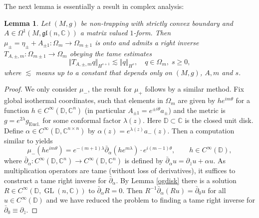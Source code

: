 \documentclass[JEP,XML,SOM,Unicode,published]{cedram}
\DeclareMathOperator{\GL}{GL}
\theoremstyle{plain}
\newtheorem{lemma}[theorem]{Lemma}
\theoremstyle{definition}
\newcommand{\C}{\mathbb{C}}
\newcommand{\DD}{\mathbb{D}}
\newcommand{\gl}{\mathfrak{gl}}
\newcommand{\1}{{\bf 1}}
\begin{document}
The next lemma is essentially a result in complex analysis:

\begin{lemma} \label{lemB}
Let $(M,g)$ be non-trapping with strictly convex boundary and $A\in \Omega^1(M,\gl(n,\C))$ a matrix valued $1$-form. Then $\mu_\pm=\eta_\pm + A_{\pm 1}: \Omega_{m}\to \Omega_{m\pm 1}$ is onto and admits a right inverse $T_{A,\pm,m}:\Omega_{m\pm 1}\to \Omega_m$ obeying the tame estimates
\begin{equation*}
\Vert T_{A,\pm,m} q \Vert_{H^{s+1}} \lesssim \Vert q \Vert_{H^s}, \quad q\in \Omega_m,\; s\ge 0,
\end{equation*}
where $\lesssim$ means up to a constant that depends only on $(M,g)$, $A,m$ and $s$.
\end{lemma}

\begin{proof}
We only consider $\mu_-$, the result for $\mu_+$ follows by a similar method. Fix global isothermal coordinates, such that elements in $\Omega_m$ are given by $he^{im\theta}$ for a function $h\in C^\infty(\DD,\C^n)$ (in particular $A_{\pm 1} = e^{\pm i \theta} a_{\pm }$) and the metric is $g=e^{2\lambda} g_{\mathrm{Eucl.}}$ for some conformal factor $\lambda(z)$. Here $\DD\subset \C$ is the closed unit disk. Define $\alpha\in C^\infty(\DD,\C^{n\times n})$ by $\alpha(z) = e^{\lambda(z)} a_{-}(z)$. Then a computation similar to \cite[Lem.\,6.1.8]{PSU20} yields
\begin{equation}\label{lemB2}
\mu_-\left( h e^{im \theta}\right) = e^{-(m+1)\lambda} \bar \partial_\alpha (h e^{m\lambda}) \cdot e^{i(m-1)\theta}, \qquad h\in C^\infty(\DD),
\end{equation}
where $\bar \partial_\alpha:C^\infty(\DD,\C^n)\to C^\infty(\DD,\C^n)$ is defined by $\bar \partial_\alpha u = \partial_{\bar z} u+ \alpha u$. As multiplication operators are tame (without loss of derivatives), it suffices to construct a tame right inverse for $\bar \partial_\alpha$.
By Lemma \ref{ogdisk} there is a solution $R\in C^\infty(\DD,\GL(n,\C))$ to $\bar \partial_\alpha R = 0$. Then
$
R^{-1}\bar \partial_{\alpha} (R u) = \bar \partial_0 u$ for all $u \in C^\infty(\DD)
$
and we have reduced the problem to finding a tame right inverse for $\bar \partial_0\equiv \partial_{\bar z}$.


\end{proof}
\end{document}
